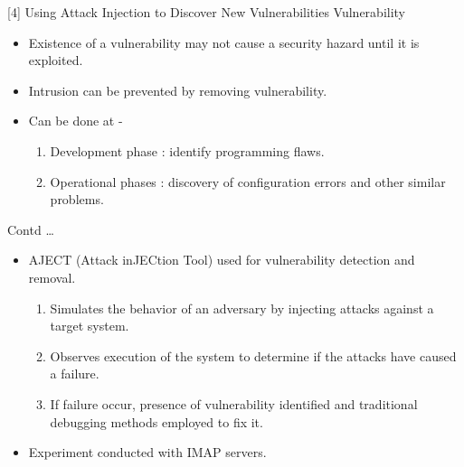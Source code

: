 \documentclass[xcolor=x11names,compress]{beamer}
\renewcommand{\(}{\begin{columns}}
\renewcommand{\)}{\end{columns}}
\newcommand{\<}[1]{\begin{column}{#1}}
\renewcommand{\>}{\end{column}}
\begin{document}
\begin{frame}{[4] Using Attack Injection
		to Discover New Vulnerabilities}
	\large
	Vulnerability
	\begin{itemize}
		\item Existence
		of a vulnerability may not cause a security hazard until it is exploited.\newline
		\item Intrusion can be prevented by removing vulnerability.\newline
		\item Can be done at -
		\begin{enumerate}
			\item Development phase : identify programming flaws. 
			\item Operational phases : discovery of configuration errors and other similar problems.
		\end{enumerate} 
	\end{itemize}
\end{frame}
\begin{frame}{Contd \dots}

	\begin{itemize}

		\item  AJECT (Attack inJECtion Tool) used for
		vulnerability detection and removal.
		\newline
		\begin{enumerate}
			\item Simulates the behavior of an adversary by injecting attacks against a target system.
			\newline
			\item  Observes execution of the system to determine
			if the attacks have caused a failure.
			\newline
			\item If failure occur, presence of vulnerability identified and traditional debugging methods employed to fix it.
			\newline
		\end{enumerate}
		\item Experiment conducted with IMAP servers.
	\end{itemize}
\end{frame}
\end{document}
